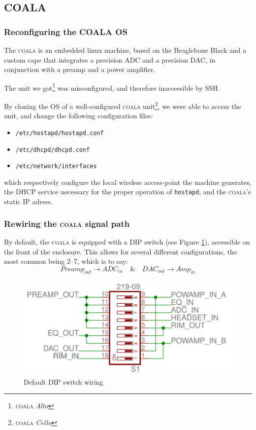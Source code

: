 \documentclass[11pt, twocolumn]{article}
\begin{document}
\subsection{COALA}
\subsubsection{Reconfiguring the COALA OS}
The \textsc{coala} is an embedded linux machine, based on the Beaglebone Black and a custom cape that integrates a precision ADC and a precision DAC, in conjunction with a preamp and a power amplifier.

The unit we got\footnote{\textsc{coala} \textit{Alto}} was misconfigured, and therefore inaccessible by SSH.

By cloning the OS of a well-configured \textsc{coala} unit\footnote{\textsc{coala} \textit{Cello}}, we were able to access the unit, and change the following configuration files:
\vspace{-0.15cm}
\begin{itemize}[noitemsep]
    \item \texttt{/etc/hostapd/hostapd.conf}
    \item \texttt{/etc/dhcpd/dhcpd.conf}
    \item \texttt{/etc/network/interfaces}
\end{itemize}
which respectively configure the local wireless access-point the machine generates, the DHCP service necessary for the proper operation of \texttt{hostapd}, and the \textsc{coala}'s static IP adress.

\subsubsection{Rewiring the \textsc{coala} signal path}
By default, the \textsc{coala} is equipped with a DIP switch (see Figure \ref{fig:coala_switch}), accessible on the front of the enclosure. This allows for several different configurations, the most common being 2--7, which is to say:
$$
\boxed{Preamp_{out}} \longrightarrow \boxed{ADC_{in}}
\quad \& \quad
\boxed{DAC_{out}} \longrightarrow \boxed{Amp_{in}}
$$
\begin{figure}[h]
    \centering
    \includegraphics[width=\linewidth]{coala_switch.PNG}
    \caption{Default DIP switch wiring}
    \label{fig:coala_switch}
\end{figure}
\end{document}
